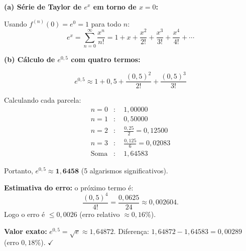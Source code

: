 \textbf{(a) Série de Taylor de $e^x$ em torno de $x=0$:}

Usando $f^{(n)}(0)=e^0=1$ para todo $n$:
\[
e^{x}=\sum_{n=0}^{\infty}\frac{x^n}{n!}=1+x+\frac{x^{2}}{2!}+\frac{x^{3}}{3!}+\frac{x^{4}}{4!}+\cdots
\]

\textbf{(b) Cálculo de $e^{0{,}5}$ com quatro termos:}

\[
e^{0{,}5}\approx 1 + 0{,}5 + \frac{(0{,}5)^2}{2!} + \frac{(0{,}5)^3}{3!}
\]

Calculando cada parcela:
\begin{align*}
n=0&: \quad 1{,}00000\\
n=1&: \quad 0{,}50000\\
n=2&: \quad \frac{0{,}25}{2} = 0{,}12500\\
n=3&: \quad \frac{0{,}125}{6} = 0{,}02083\\
\hline
\text{Soma}&: \quad 1{,}64583
\end{align*}

Portanto, $e^{0{,}5}\approx\mathbf{1{,}6458}$ (5 algarismos significativos).

\textbf{Estimativa do erro:} o próximo termo é:
\[
\frac{(0{,}5)^4}{4!}=\frac{0{,}0625}{24}\approx0{,}002604.
\]
Logo o erro é $\leq0{,}0026$ (erro relativo $\approx0{,}16\%$).

\textbf{Valor exato:} $e^{0{,}5}=\sqrt{e}\approx1{,}64872$. Diferença: $1{,}64872-1{,}64583=0{,}00289$ (erro $0{,}18\%$). $\checkmark$